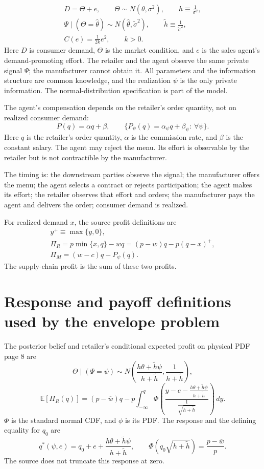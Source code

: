 \documentclass{article}
\begin{document}
\begin{gather*}
D=\Theta+e,\qquad
\Theta\sim N(\theta,\sigma^2),\qquad h\equiv\frac{1}{\sigma^2},\\
\Psi\mid(\Theta=\widehat\theta)\sim N(\widehat\theta,\widetilde\sigma^2),
\qquad \widetilde h\equiv\frac{1}{\widetilde\sigma^2},\\
C(e)=\frac{1}{2k}e^2,\qquad k>0.
\end{gather*}
Here \(D\) is consumer demand, \(\Theta\) is the market condition, and \(e\) is the sales agent's demand-promoting effort. The retailer and the agent observe the same private signal \(\Psi\); the manufacturer cannot obtain it. All parameters and the information structure are common knowledge, and the realization \(\psi\) is the only private information. The normal-distribution specification is part of the model.

The agent's compensation depends on the retailer's order quantity, not on realized consumer demand:
\[
P(q)=\alpha q+\beta,
\qquad
\{P_\psi(q)=\alpha_\psi q+\beta_\psi:\ \forall\psi\}.
\]
Here \(q\) is the retailer's order quantity, \(\alpha\) is the commission rate, and \(\beta\) is the constant salary. The agent may reject the menu. Its effort is observable by the retailer but is not contractible by the manufacturer.

The timing is: the downstream parties observe the signal; the manufacturer offers the menu; the agent selects a contract or rejects participation; the agent makes its effort; the retailer observes that effort and orders; the manufacturer pays the agent and delivers the order; consumer demand is realized.

For realized demand \(x\), the source profit definitions are
\begin{gather*}
y^+\equiv\max\{y,0\},\\
\Pi_R=p\min\{x,q\}-wq=(p-w)q-p(q-x)^+,\\
\Pi_M=(w-c)q-P_\psi(q).
\end{gather*}
The supply-chain profit is the sum of these two profits.

\section*{Response and payoff definitions used by the envelope problem}

The posterior belief and retailer's conditional expected profit on physical PDF page 8 are
\[
\Theta\mid(\Psi=\psi)\sim
N\left(\frac{h\theta+\widetilde h\psi}{h+\widetilde h},\frac{1}{h+\widetilde h}\right),
\]
\[
\mathbb E[\Pi_R(q)]
=(p-\overline w)q-p\int_{-\infty}^{q}
\Phi\left(
\frac{y-e-\frac{h\theta+\widetilde h\psi}{h+\widetilde h}}
{\frac{1}{\sqrt{h+\widetilde h}}}
\right)\,dy.
\]
\(\Phi\) is the standard normal CDF, and \(\phi\) is its PDF. The response and the defining equality for \(q_0\) are
\[
q^*(\psi,e)=q_0+e+\frac{h\theta+\widetilde h\psi}{h+\widetilde h},
\qquad
\Phi\left(q_0\sqrt{h+\widetilde h}\right)=\frac{p-\overline w}{p}.
\]
The source does not truncate this response at zero.
\end{document}
